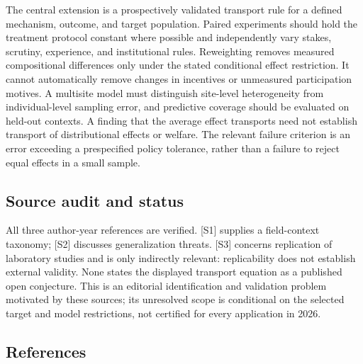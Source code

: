 \documentclass[11pt,a4paper]{article}
\begin{document}
The central extension is a prospectively validated transport rule for a defined mechanism, outcome, and target population. Paired experiments should hold the treatment protocol constant where possible and independently vary stakes, scrutiny, experience, and institutional rules. Reweighting removes measured compositional differences only under the stated conditional effect restriction. It cannot automatically remove changes in incentives or unmeasured participation motives. A multisite model must distinguish site-level heterogeneity from individual-level sampling error, and predictive coverage should be evaluated on held-out contexts. A finding that the average effect transports need not establish transport of distributional effects or welfare. The relevant failure criterion is an error exceeding a prespecified policy tolerance, rather than a failure to reject equal effects in a small sample.

\subsection*{Source audit and status}

All three author-year references are verified. [S1] supplies a field-context taxonomy; [S2] discusses generalization threats. [S3] concerns replication of laboratory studies and is only indirectly relevant: replicability does not establish external validity. None states the displayed transport equation as a published open conjecture. This is an editorial identification and validation problem motivated by these sources; its unresolved scope is conditional on the selected target and model restrictions, not certified for every application in 2026.

\subsection*{References}
\end{document}
